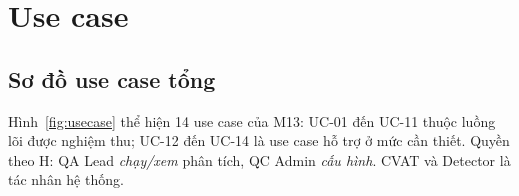 \chapter{Use case}
\label{ch:usecase}

\section{Sơ đồ use case tổng}
Hình~\ref{fig:usecase} thể hiện 14 use case của M13: UC-01 đến UC-11 thuộc luồng
lõi được nghiệm thu; UC-12 đến UC-14 là use case hỗ trợ ở mức cần thiết. Quyền
theo H: QA Lead \emph{chạy/xem} phân tích, QC Admin \emph{cấu hình}. CVAT và
Detector là tác nhân hệ thống.

